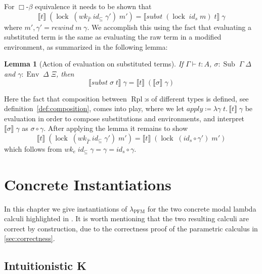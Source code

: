 \documentclass[12pt,twoside,openright]{report}
\numberwithin{equation}{chapter}
\numberwithin{figure}{chapter}
\numberwithin{table}{chapter}
\newtheorem{lemma}[theorem]{Lemma}
\theoremstyle{definition}\newtheorem{definition}{Definition}
\begin{document}
For $\Box\text{-}\beta$ equivalence it needs to be shown that
$$ \llbracket t \rrbracket \; (\operatorname{lock} \; (\textit{wk}_{\widehat\Gamma} \; \textit{id}_\subseteq \; \gamma') \; m') = \llbracket \textit{subst} \; (\operatorname{lock} \; \textit{id}_s \; m) \; t \rrbracket \; \gamma $$
where $m' , \gamma' = \textit{rewind} \; m \; \gamma$.
We accomplish this using the fact that evaluating a substituted term
is the same as evaluating the raw term in a modified environment,
as summarized in the following lemma:
\begin{lemma}[Action of evaluation on substituted terms]
  If $\Gamma \vdash t : A$, $\sigma : \operatorname{Sub} \; \Gamma \; \Delta$
  and $\gamma : \operatorname{Env} \; \Delta \; \Xi$, then
  $$ \llbracket \textit{subst} \; \sigma \; t \rrbracket \; \gamma = \llbracket t \rrbracket \; (\llbracket \sigma \rrbracket \; \gamma) $$
\end{lemma}
Here the fact that composition between $\operatorname{Rpl}$:s of different types is defined,
see definition~\ref{def:composition}, comes into play,
where we let $\textit{apply} \coloneqq \lambda \gamma \; t.\, \llbracket t \rrbracket \; \gamma$ be evaluation
in order to compose substitutions and environments,
and interpret $\llbracket \sigma \rrbracket \; \gamma$ as $\sigma \circ \gamma$.
After applying the lemma it remains to show
$$ \llbracket t \rrbracket \; (\operatorname{lock} \; (\textit{wk}_{\widehat\Gamma} \; \textit{id}_\subseteq \; \gamma') \; m') = \llbracket t \rrbracket \; (\operatorname{lock} \; (\textit{id}_s \circ \gamma') \; m') $$
which follows from
$wk_e \; \textit{id}_\subseteq \; \gamma = \gamma = \textit{id}_s \circ \gamma$.

\chapter{Concrete Instantiations}\label{sec:instantiations}

In this chapter we give instantiations of $\lambda_\text{PFM}$
for the two concrete modal lambda calculi highlighted in \cite{valliappan22}.
It is worth mentioning that the two resulting calculi are correct by construction,
due to the correctness proof of the parametric calculus in \autoref{sec:correctness}.

\section{Intuitionistic K}\label{sec:ik}
\end{document}
